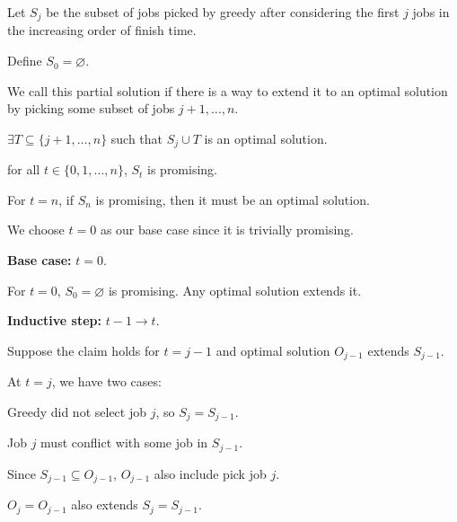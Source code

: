 \begin{listu}
    \item Let $S_j$ be the subset of jobs picked by greedy after considering the first $j$ jobs in the increasing order of finish time.

    Define $S_0 = \varnothing$.

    \item We call this partial solution  if there is a way to extend it to an optimal solution by picking some subset of jobs $j + 1, \dots, n$.

    $\exists T \subseteq \{j + 1, \dots, n\}$ such that $S_j \cup T$ is an optimal solution.

    \item {} for all $t \in \{0, 1, \dots, n\}$, $S_t$ is promising.

    \begin{listu}
        \item For $t = n$, if $S_n$ is promising, then it must be an optimal solution.

        \item We choose $t = 0$ as our base case since it is trivially promising.
    \end{listu}

    \item \textbf{Base case:} $t = 0$.

    For $t = 0$, $S_0 = \varnothing$ is promising. Any optimal solution extends it.

    \item \textbf{Inductive step:} $t - 1 \to t$.

    Suppose the claim holds for $t = j - 1$ and optimal solution $O_{j-1}$ extends $S_{j-1}$.

    At $t = j$, we have two cases:

    \begin{listo}
        \item Greedy did not select job $j$, so $S_j = S_{j-1}$.

        \begin{listu}
            \item Job $j$ must conflict with some job in $S_{j-1}$.
            \item Since $S_{j-1} \subseteq O_{j-1}$, $O_{j-1}$ also include pick job $j$.
            \item $O_j = O_{j-1}$ also extends $S_j = S_{j-1}$.
        \end{listu}


\end{listo}
\end{listu}
